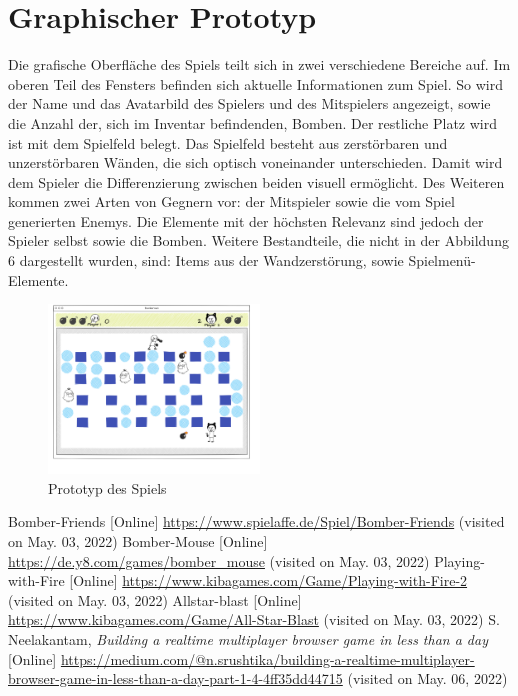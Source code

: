\documentclass[conference]{IEEEtran}
\begin{document}
\section{Graphischer Prototyp}
Die grafische Oberfläche des Spiels teilt sich in zwei verschiedene Bereiche auf. Im oberen Teil des Fensters befinden sich aktuelle Informationen zum Spiel. So wird der Name und das Avatarbild des Spielers und des Mitspielers angezeigt, sowie die Anzahl der, sich im Inventar befindenden, Bomben. Der restliche Platz wird ist mit dem Spielfeld belegt. Das Spielfeld besteht aus zerstörbaren und unzerstörbaren Wänden, die sich optisch voneinander unterschieden. Damit wird dem Spieler die Differenzierung zwischen beiden visuell ermöglicht. Des Weiteren kommen zwei Arten von Gegnern vor: der Mitspieler sowie die vom Spiel generierten Enemys.
Die Elemente mit der höchsten Relevanz sind jedoch der Spieler selbst sowie die Bomben. Weitere Bestandteile, die nicht in der Abbildung 6 dargestellt wurden, sind: Items aus der Wandzerstörung, sowie Spielmenü-Elemente. 
\begin{figure}[H]
    \centering
    \includegraphics[width=0.5\textwidth]{res/prototyp.png}
    \caption{Prototyp des Spiels}
\end{figure}

\nocite{space-invaders}
\begin{thebibliography}{0}
	Bomber-Friends [Online] \url{https://www.spielaffe.de/Spiel/Bomber-Friends} (visited on May. 03, 2022)
	Bomber-Mouse [Online] \url{https://de.y8.com/games/bomber_mouse} (visited on May. 03, 2022)
	Playing-with-Fire [Online] \url{https://www.kibagames.com/Game/Playing-with-Fire-2 } (visited on May. 03, 2022)
	Allstar-blast [Online] \url{https://www.kibagames.com/Game/All-Star-Blast} (visited on May. 03, 2022)
	S. Neelakantam,	\textit{Building a realtime multiplayer browser game in less than a day} [Online] \url{https://medium.com/@n.srushtika/building-a-realtime-multiplayer-browser-game-in-less-than-a-day-part-1-4-4ff35dd44715} (visited on May. 06, 2022)

\end{thebibliography}
\vspace{12pt}
\end{document}

